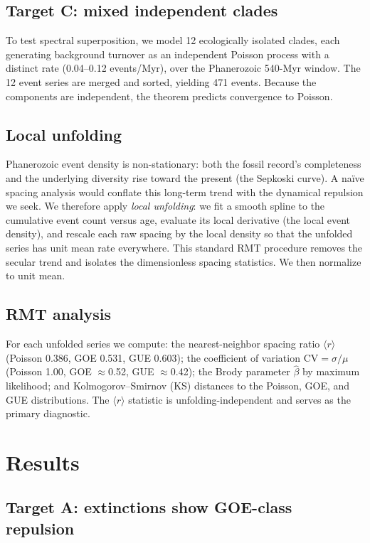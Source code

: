 \documentclass[12pt,a4paper]{article}
\begin{document}
\subsection{Target C: mixed independent clades}

To test spectral superposition, we model 12 ecologically isolated clades, each generating background turnover as an independent Poisson process with a distinct rate (0.04--0.12 events/Myr), over the Phanerozoic 540-Myr window. The 12 event series are merged and sorted, yielding 471 events. Because the components are independent, the theorem predicts convergence to Poisson.

\subsection{Local unfolding}

Phanerozoic event density is non-stationary: both the fossil record's completeness and the underlying diversity rise toward the present (the Sepkoski curve). A na\"ive spacing analysis would conflate this long-term trend with the dynamical repulsion we seek. We therefore apply \emph{local unfolding}: we fit a smooth spline to the cumulative event count versus age, evaluate its local derivative (the local event density), and rescale each raw spacing by the local density so that the unfolded series has unit mean rate everywhere. This standard RMT procedure removes the secular trend and isolates the dimensionless spacing statistics. We then normalize to unit mean.

\subsection{RMT analysis}

For each unfolded series we compute: the nearest-neighbor spacing ratio $\langle r\rangle$ \citep{atas2013} (Poisson 0.386, GOE 0.531, GUE 0.603); the coefficient of variation $\mathrm{CV}=\sigma/\mu$ (Poisson 1.00, GOE $\approx$0.52, GUE $\approx$0.42); the Brody parameter $\hat\beta$ by maximum likelihood; and Kolmogorov--Smirnov (KS) distances to the Poisson, GOE, and GUE distributions. The $\langle r\rangle$ statistic is unfolding-independent and serves as the primary diagnostic.

\section{Results}

\subsection{Target A: extinctions show GOE-class repulsion}
\end{document}
